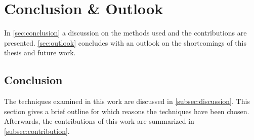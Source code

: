 \chapter{Conclusion \& Outlook}\label{ch:conclusion-outlook}

In \autoref{sec:conclusion} a discussion on the methods used and the contributions are presented.
\autoref{sec:outlook} concludes with an outlook on the shortcomings of this thesis and future work.

\section{Conclusion}\label{sec:conclusion}

The techniques examined in this work are discussed in \autoref{subsec:discussion}.
This section gives a brief outline for which reasons the techniques have been chosen.
Afterwards, the contributions of this work are summarized in \autoref{subsec:contribution}.







